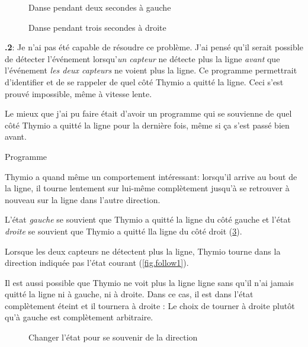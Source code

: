 \documentclass[12pt,a4paper,french]{article}
\begin{document}
\begin{figure}
\begin{center}
\caption{Danse pendant deux secondes à gauche}\label{fig.dance-left}
\end{center}
\end{figure}

\begin{figure}
\begin{center}
\caption{Danse pendant trois secondes à droite}\label{fig.dance-right}
\end{center}
\end{figure}

\textbf{\thesection.2}:
Je n'ai pas été capable de résoudre ce problème. J'ai pensé qu'il serait possible de détecter l'événement lorsqu'\emph{un capteur} ne détecte plus la ligne \emph{avant} que l'événement \emph{les deux capteurs} ne voient plus la ligne. Ce programme permettrait d'identifier et de se rappeler de quel côté Thymio a quitté la ligne. Ceci s'est prouvé impossible, même à vitesse lente.

Le mieux que j'ai pu faire était d'avoir un programme qui se souvienne de quel côté Thymio a quitté la ligne pour la dernière fois, même si ça s'est passé bien avant.

{\raggedleft \hfill Programme }

Thymio a quand même un comportement intéressant: lorsqu'il arrive au bout de la ligne, il tourne lentement sur lui-même complètement jusqu'à se retrouver à nouveau sur la ligne dans l'autre direction.

L'état \emph{gauche}  se souvient que Thymio a quitté la ligne du côté gauche et l'état \emph{droite}  se souvient que Thymio a quitté lla ligne du côté droit (\cref{fig.follow3}).

Lorsque les deux capteurs ne détectent plus la ligne, Thymio tourne dans la direction indiquée pas l'état courant (\cref{fig.follow1}). 

Il est aussi possible que Thymio ne voit plus la ligne ligne sans qu'il n'ai jamais quitté la ligne ni à gauche, ni à droite. Dans ce cas, il est dans l'état complètement éteint et il tournera à droite :  Le choix de tourner à droite plutôt qu'à gauche est complètement arbitraire.

\begin{figure}
\begin{center}
\caption{Changer l'état pour se souvenir de la direction}\label{fig.follow3}
\end{center}
\end{figure}
\end{document}
